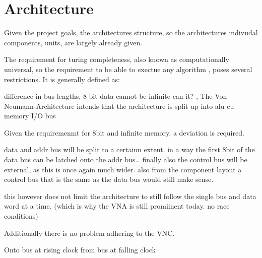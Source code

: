 \section{Architecture}

Given the project goals, the architectures structure, so the architectures indivudal components, units, are largely already given. 

The requirement for turing completeness, also known as computationally universal, so the requirement to be able to exectue any algorithm \cite{cit.needed}, poses several restrictions. It is generally defined as:
  
\cite{cit.needed}


difference in bus lengths, 8-bit data cannot be infinite can it?
,
The Von-Neumann-Architecture \cite{vonneuman1945a} intends that the architecture is split up into 
alu
cu 
memory 
I/O
bus 

Given the requiremenmt for 8bit and infinite memory, a deviation is required. 

data and addr bus will be split to a certainn extent. in a way the first 8bit of the data bus can be latched onto the addr bus\dots
finally also the control bus will be external, as this is once again much wider. also from the component layout a control bus that is the same as the data bus would still make sense. 

this however does not limit the architecture to still follow the single bus and data word at a time. (which is why the VNA is still promiinent today. no race conditions)

Additionally there is no problem adhering to the VNC. 


Onto bus at rising clock
from bus at falling clock













